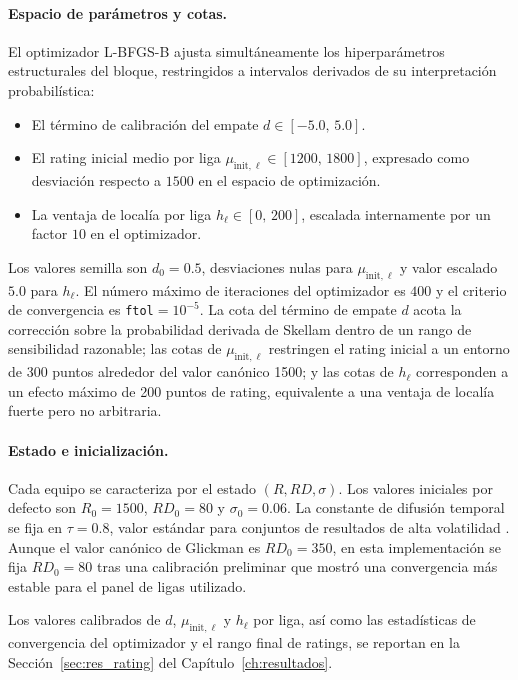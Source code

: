 \paragraph{Espacio de par\'ametros y cotas.} El optimizador L-BFGS-B \cite{byrd1995limited} ajusta simult\'aneamente los hiperpar\'ametros estructurales del bloque, restringidos a intervalos derivados de su interpretaci\'on probabil\'istica:
\begin{itemize}
	\item El t\'ermino de calibraci\'on del empate $d \in [-5{.}0,\, 5{.}0]$.
	\item El rating inicial medio por liga 	$\mu_{\text{init},\ell} \in [1200,\, 1800]$, expresado como desviaci\'on respecto a $1500$ en el espacio de optimizaci\'on.
	\item La ventaja de local\'ia por liga $h_\ell \in [0,\, 200]$, escalada internamente por un factor $10$ en el optimizador.
\end{itemize}
Los valores semilla son $d_0 = 0{.}5$, desviaciones nulas para $\mu_{\text{init},\ell}$ y valor escalado $5{.}0$ para $h_\ell$. El n\'umero m\'aximo de iteraciones del optimizador es $400$ y el criterio de convergencia es \texttt{ftol}$=10^{-5}$. La cota del t\'ermino de empate $d$ acota la correcci\'on sobre la probabilidad derivada de Skellam dentro de un rango de sensibilidad razonable; las cotas de $\mu_{\text{init},\ell}$ restringen el rating inicial a un entorno de 300 puntos alrededor del valor can\'onico 1500; y las cotas de $h_\ell$ corresponden a un efecto m\'aximo de 200 puntos de rating, equivalente a una ventaja de local\'ia fuerte pero no arbitraria.

\paragraph{Estado e inicializaci\'on.} Cada equipo se caracteriza por el estado $(R, RD, \sigma)$. Los valores iniciales por defecto son $R_0 = 1500$, $RD_0 = 80$ y $\sigma_0 = 0{.}06$. La constante de difusi\'on temporal se fija en $\tau = 0{.}8$, valor est\'andar para conjuntos de resultados de alta volatilidad \cite{Glickman2022}. Aunque el valor can\'onico de Glickman es $RD_0=350$, en esta implementaci\'on se fija $RD_0=80$ tras una calibraci\'on preliminar que mostr\'o una convergencia m\'as estable para el panel de ligas utilizado.

Los valores calibrados de $d$, $\mu_{\text{init},\ell}$ y $h_\ell$ por liga, as\'i como las estad\'isticas de convergencia del optimizador y el rango final de ratings, se reportan en la Secci\'on~\ref{sec:res_rating} del Cap\'itulo~\ref{ch:resultados}.

